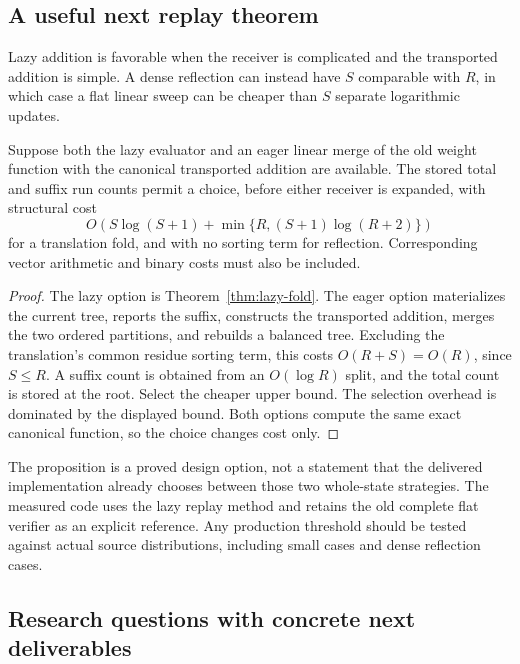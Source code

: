 \subsection{A useful next replay theorem}

Lazy addition is favorable when the receiver is complicated and the
transported addition is simple. A dense reflection can instead have
\(S\) comparable with \(R\), in which case a flat linear sweep can be
cheaper than \(S\) separate logarithmic updates.

\begin{proposition}
\label{prop:hybrid}
Suppose both the lazy evaluator and an eager linear merge of the old
weight function with the canonical transported addition are available.
The stored total and suffix run counts permit a choice, before either
receiver is expanded, with structural cost
\[
 O\!\left(
 S\log(S+1)+
 \min\{R,(S+1)\log(R+2)\}
 \right)
\]
for a translation fold, and with no sorting term for reflection.
Corresponding vector arithmetic and binary costs must also be included.
\end{proposition}
\begin{proof}
The lazy option is Theorem~\ref{thm:lazy-fold}. The eager option
materializes the current tree, reports the suffix, constructs the
transported addition, merges the two ordered partitions, and rebuilds a
balanced tree. Excluding the translation's common residue sorting term,
this costs \(O(R+S)=O(R)\), since \(S\le R\). A suffix count is obtained
from an \(O(\log R)\) split, and the total count is stored at the root.
Select the cheaper upper bound. The selection overhead is dominated by
the displayed bound. Both options compute the same exact canonical
function, so the choice changes cost only.
\end{proof}

The proposition is a proved design option, not a statement that the
delivered implementation already chooses between those two whole-state
strategies. The measured code uses the lazy replay method and retains the
old complete flat verifier as an explicit reference. Any production
threshold should be tested against actual source distributions, including
small cases and dense reflection cases.

\subsection{Research questions with concrete next deliverables}

